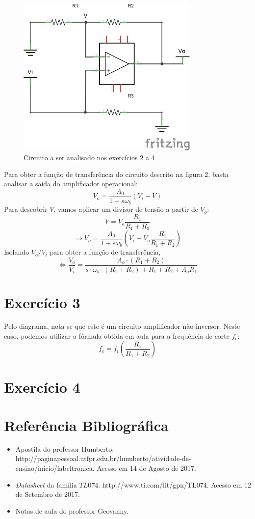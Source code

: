 \documentclass[12pt, a4paper, twoside]{article}
\begin{document}
\begin{figure}
    \centering
    \includegraphics[width=0.8\textwidth]{figs/rel2/ex2.png}
    \caption{Circuito a ser analisado nos exercícios 2 a 4}
\end{figure}

Para obter a função de transferência do circuito descrito na figura 2, basta analisar a saída do amplificador operacional:
$$ V_o = \frac{A_0}{1+s \omega_b}(V_i-V) $$
Para descobrir $V$, vamos aplicar um divisor de tensão a partir de $V_o$:
$$ V = V_o \frac{R_1}{R_1 + R_2} $$
$$ \Rightarrow V_o = \frac{A_0}{1+s \omega_b} \left(V_i - V_o \frac{R_1}{R_1 + R_2} \right) $$
Isolando $V_o/V_i$ para obter a função de transferência,
$$ \Leftrightarrow \frac{V_o}{V_i} = \frac{A_o\cdotp(R_1 + R_2)}{s\cdotp\omega_b\cdotp(R_1+R_2)+R_1+R_2+A_oR_1} $$

\section{Exercício 3}

Pelo diagrama, nota-se que este é um circuito amplificador não-inversor. Neste caso, podemos utilizar a fórmula obtida em aula para a frequência de corte $f_c$:
$$ f_c = f_t \left( \frac{R_1}{R_1 + R_2} \right) $$

\section{Exercício 4}


\section{Referência Bibliográfica}

\begin{itemize}
    \item Apostila do professor Humberto. http://paginapessoal.utfpr.edu.br/humberto/atividade-de-ensino/inicio/labeltronica. Acesso em 14 de Agosto de 2017.
    \item \textit{Datasheet} da família $TL074$. http://www.ti.com/lit/gpn/TL074. Acesso em 12 de Setembro de 2017.
    \item Notas de aula do professor Geovanny.
\end{itemize}
\end{document}
